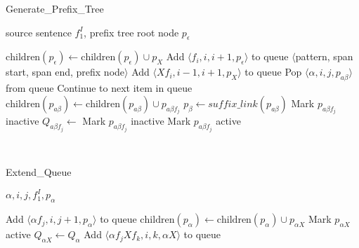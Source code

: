 
\newcommand\varsuffix{\mathit{suffix}}
\newcommand\varprefix{\mathit{prefix}}
\newcommand\funcchildren{\mathrm{children}}

\newcommand\sufflink{\mathit{suffix\_link}}

 {\sc Generate\_Prefix\_Tree}

 source sentence $f_1^I$, prefix tree root node $p_\epsilon$
\begin{algorithmic}[1]

	\State $\funcchildren(p_\epsilon) \leftarrow \funcchildren(p_\epsilon) \cup p_X$
		\State Add $\langle f_i,i,i+1,p_\epsilon \rangle$ to queue \Comment $\langle$pattern, span start, span end, prefix node$\rangle$
	\EndFor
		\State Add $\langle Xf_i, i-1, i+1, p_X \rangle$ to queue
	\EndFor
		\State Pop $\langle \alpha, i, j, p_{a\beta} \rangle$ from queue
		\If {$p_{a\beta{}f_j} \in \funcchildren(p_{a\beta})$}
				\State Continue to next item in queue
			\Else
				\State {}
			\EndIf
		\Else
			\State $\funcchildren(p_{a\beta}) \leftarrow \funcchildren(p_{a\beta}) \cup p_{a\beta{}f_j}$
			\State $p_\beta{} \leftarrow \sufflink(p_{a\beta})$
				\State Mark $p_{a\beta{}f_j}$ inactive
			\Else
				\State $Q_{a\beta{}f_j} \leftarrow$ 
					\State Mark $p_{a\beta{}f_j}$ inactive
				\Else
					\State Mark $p_{a\beta{}f_j}$ active
					\State {}
				\EndIf
			\EndIf
		\EndIf
	\EndWhile

\end{algorithmic}

~

 {\sc Extend\_Queue}

 $\alpha, i, j, f_1^I, p_\alpha$
\begin{algorithmic}[1]
		\State Add $\langle \alpha{}f_j, i, j+1, p_\alpha \rangle$ to queue
			\State $\funcchildren(p_{\alpha}) \leftarrow \funcchildren(p_{\alpha}) \cup p_{\alpha{}X}$
			\State Mark $p_{\alpha{}X}$ active
			\State $Q_{\alpha{}X} \leftarrow Q_\alpha$ 
				\State Add $\langle \alpha{}f_jXf_k, i, k, \alpha{}X \rangle$ to queue
			\EndFor
		\EndIf
	\EndIf
\end{algorithmic}

